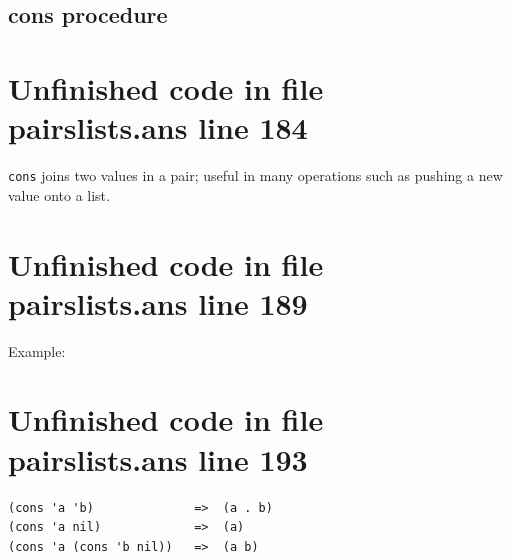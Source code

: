 \documentclass[twoside,9pt]{report}
\begin{document}
\subsection{cons procedure}
\label{cons-procedure}
\section{Unfinished code in file pairslists.ans line 184}


\texttt{cons} joins two values in a pair; useful in many operations such as pushing a new value onto a list.

\section{Unfinished code in file pairslists.ans line 189}


Example:

\section{Unfinished code in file pairslists.ans line 193}
\begin{verbatim}
(cons 'a 'b)              =>  (a . b)
(cons 'a nil)             =>  (a)
(cons 'a (cons 'b nil))   =>  (a b)
\end{verbatim}
\end{document}
